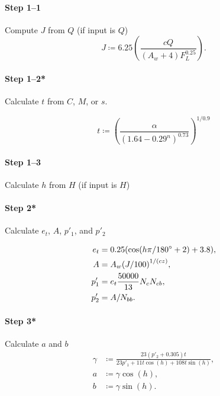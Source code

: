 \documentclass[twocolumn]{scrartcl}
\begin{document}
\paragraph{Step 1--1}{%
  Compute $J$ from $Q$ (if input is $Q$)
  \[
    J\coloneqq 6.25 \left(\frac{cQ}{(A_w+4) F_L^{0.25}}\right).
    \]}

\paragraph{Step 1--2*}{%
Calculate $t$ from $C$, $M$, or $s$.


\[
  t \coloneqq {\left(\frac{\alpha}{{(1.64 - 0.29^n)}^{0.73}}\right)}^{1/0.9}
\]
}

\paragraph{Step 1--3}{%
  Calculate $h$ from $H$ (if input is $H$)
}

\paragraph{Step 2*}{%
Calculate $e_t$, $A$, $p'_1$, and $p'_2$

\begin{align*}
  e_t &= 0.25 (\cos(h\pi/180\degree + 2) + 3.8),\\
  A &= A_w  {(J/100)}^{1/(cz)},\\
  p'_1 &= e_t \frac{50000}{13} N_c N_{cb},\\
  p'_2 &= A / N_{bb}.
\end{align*}
}

\paragraph{Step 3*}{%
Calculate $a$ and $b$
  \begin{align*}
    \gamma &\coloneqq \frac{23 (p'_2+0.305) t}{23 p'_1 + 11 t \cos(h) + 108 t \sin(h)},\\
    a &\coloneqq \gamma \cos(h),\\
    b &\coloneqq \gamma \sin(h).
  \end{align*}}
\end{document}
